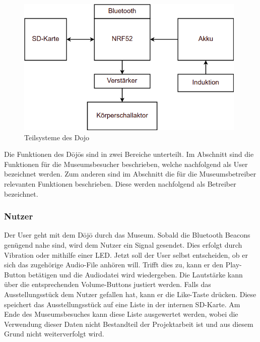 \begin{figure}[H]
	\begin{center}
		\includegraphics[width=110mm]{data/Loesungskonzept_Teilsysteme.png}
		\caption{Teilsysteme des Dojo} %
		\label{fig:Teilsysteme}
	\end{center}
\end{figure}

Die Funktionen des Dōjōs sind in zwei Bereiche unterteilt. Im Abschnitt  sind die Funktionen für die Museumsbesucher beschrieben, welche nachfolgend als User bezeichnet werden. Zum anderen sind im Abschnitt  die für die Museumsbetreiber relevanten Funktionen beschrieben. Diese werden nachfolgend als Betreiber bezeichnet.

\subsubsection*{Nutzer} \label{sec:funktionNutzer}
Der User geht mit dem Dōjō durch das Museum. Sobald die Bluetooth Beacons genügend nahe sind, wird dem Nutzer ein Signal gesendet. Dies erfolgt durch Vibration oder mithilfe einer LED. Jetzt soll der User selbst entscheiden, ob er sich das zugehörige Audio-File anhören will. Trifft dies zu, kann er den Play-Button betätigen und die Audiodatei wird wiedergeben. Die Lautstärke kann über die entsprechenden Volume-Buttons justiert werden. Falls das Ausstellungsstück dem Nutzer gefallen hat, kann er die \glqq Like\grqq-Taste drücken. Diese speichert das Ausstellungsstück auf eine Liste in der internen SD-Karte. Am Ende des Museumsbesuches kann diese Liste ausgewertet werden, wobei die Verwendung dieser Daten nicht Bestandteil der Projektarbeit ist und aus diesem Grund nicht weiterverfolgt wird.

